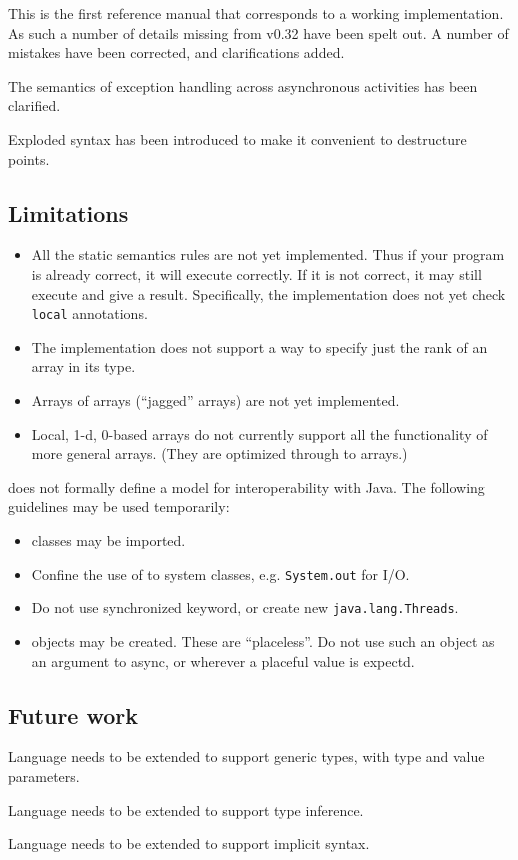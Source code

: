 
This is the first reference manual that corresponds to a working
implementation. As such a number of details missing from v0.32 have
been spelt out. A number of mistakes have been corrected, and
clarifications added.

The semantics of exception handling across asynchronous activities has
been clarified.

Exploded syntax has been introduced to make it convenient to
destructure points. 

\subsection{Limitations}

\begin{itemize}
\item All the static semantics rules are not yet implemented. 
Thus if your program is already correct, it will execute correctly. If
it is not correct, it may still execute and give a
result. Specifically, the implementation does not yet check {\tt
local} annotations.

\item The implementation does not support a way to specify just the rank of
an array in its type.

\item Arrays of arrays (``jagged'' arrays) are not yet implemented.

\item Local, 1-d, 0-based arrays do not currently support all the
functionality of more general arrays. (They are optimized through to
\Java{} arrays.)

\end{itemize}

\XtenCurrVer{} does not formally define a model for interoperability with
Java. The following guidelines may be used temporarily:

\begin{itemize}
  \item \Java{} classes may be imported.
  \item Confine the use of \Java{} to system classes, e.g.{}
{\tt  System.out} for I/O.
  \item Do not use synchronized keyword, or create new {\tt java.lang.Threads}. 
  \item \Java{} objects may be created. These are ``placeless''. Do not use
     such an object as an argument to async, or wherever a placeful
     value is expectd.
\end{itemize}

\subsection{Future work}

Language needs to be extended to support generic types, with
type and value parameters.

Language needs to be extended to support type inference.

Language needs to be extended to support implicit syntax.